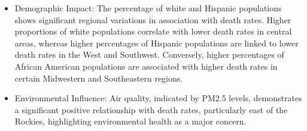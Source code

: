 \documentclass[
]{article}
\providecommand{\tightlist}{%
  \setlength{\itemsep}{0pt}\setlength{\parskip}{0pt}}\usepackage{longtable,booktabs,array}
\begin{document}
\begin{figure}
\begin{minipage}{0.50\linewidth}
\begin{figure}[H]
{}

\caption{\label{fig-3-4}}

\end{figure}%

\end{minipage}%

\end{figure}%

\begin{itemize}
\tightlist
\item
  Demographic Impact: The percentage of white and Hispanic populations
  shows significant regional variations in association with death rates.
  Higher proportions of white populations correlate with lower death
  rates in central areas, whereas higher percentages of Hispanic
  populations are linked to lower death rates in the West and Southwest.
  Conversely, higher percentages of African American populations are
  associated with higher death rates in certain Midwestern and
  Southeastern regions.
\end{itemize}

\begin{figure}


\caption{\label{fig-7}}

\end{figure}%

\begin{itemize}
\tightlist
\item
  Environmental Influence: Air quality, indicated by PM2.5 levels,
  demonstrates a significant positive relationship with death rates,
  particularly east of the Rockies, highlighting environmental health as
  a major concern.
\end{itemize}
\end{document}
